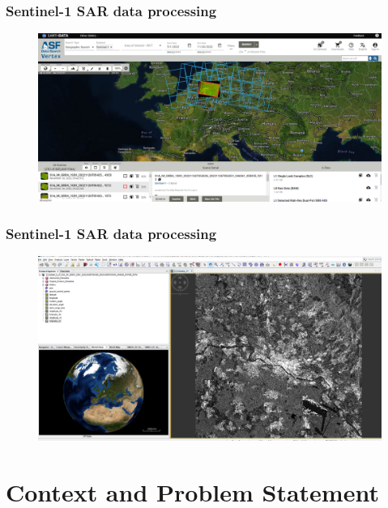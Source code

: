 \documentclass[aspectratio=1610,10pt]{beamer}
\begin{document}
		\begin{frame} \frametitle{\large{Sentinel-1 SAR data processing}}%
\begin{figure}[H] 
         \centering
         \includegraphics[scale=0.28]{./Figures/alaska1} \vspace{0.1cm}
        \caption*{}
    \end{figure}
\end{frame} 
		
		
				\begin{frame} \frametitle{\large{Sentinel-1 SAR data processing}}%
\begin{figure}[H] 
         \centering
         \includegraphics[scale=0.28]{./Figures/snap_1} \vspace{0.1cm}
        \caption*{}
    \end{figure}
\end{frame} 

\section{Context and Problem Statement}
\end{document}
